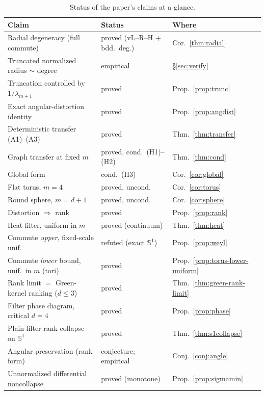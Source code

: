 \documentclass[review]{siamart220329}
\begin{document}
\begin{table}[h]\footnotesize\centering
\caption{Status of the paper's claims at a glance.}
\label{tab:claims}
\begin{tabular}{@{}lll@{}}
\toprule
Claim & Status & Where \\
\midrule
Radial degeneracy (full commute) & proved (vL--R--H + bdd.\ deg.) & Cor.~\ref{thm:radial} \\
Truncated normalized radius $\sim$ degree & empirical & \S\ref{sec:verify} \\
Truncation controlled by $1/\lambda_{m+1}$ & proved & Prop.~\ref{prop:trunc} \\
Exact angular-distortion identity & proved & Prop.~\ref{prop:angdist} \\
Deterministic transfer (A1)--(A3) & proved & Thm.~\ref{thm:transfer} \\
Graph transfer at fixed $m$ & proved, cond.\ (H1)--(H2) & Thm.~\ref{thm:cond} \\
Global form & cond.\ (H3) & Cor.~\ref{cor:global} \\
Flat torus, $m=4$ & proved, uncond. & Cor.~\ref{cor:torus} \\
Round sphere, $m=d+1$ & proved, uncond. & Cor.~\ref{cor:sphere} \\
Distortion $\Rightarrow$ rank & proved & Prop.~\ref{prop:rank} \\
Heat filter, uniform in $m$ & proved (continuum) & Thm.~\ref{thm:heat} \\
Commute \emph{upper}, fixed-scale unif. & refuted (exact $\mathbb S^1$) & Prop.~\ref{prop:weyl} \\
Commute \emph{lower} bound, unif.\ in $m$ (tori) & proved & Prop.~\ref{prop:torus-lower-uniform} \\
Rank limit $=$ Green-kernel ranking ($d\le3$) & proved & Thm.~\ref{thm:green-rank-limit} \\
Filter phase diagram, critical $d=4$ & proved & Prop.~\ref{prop:phase} \\
Plain-filter rank collapse on $\mathbb S^1$ & proved & Thm.~\ref{thm:s1collapse} \\
Angular preservation (rank form) & conjecture; empirical & Conj.~\ref{conj:angle} \\
Unnormalized differential noncollapse & proved (monotone) & Prop.~\ref{prop:sigmamin} \\
\bottomrule
\end{tabular}
\end{table}
\end{document}
